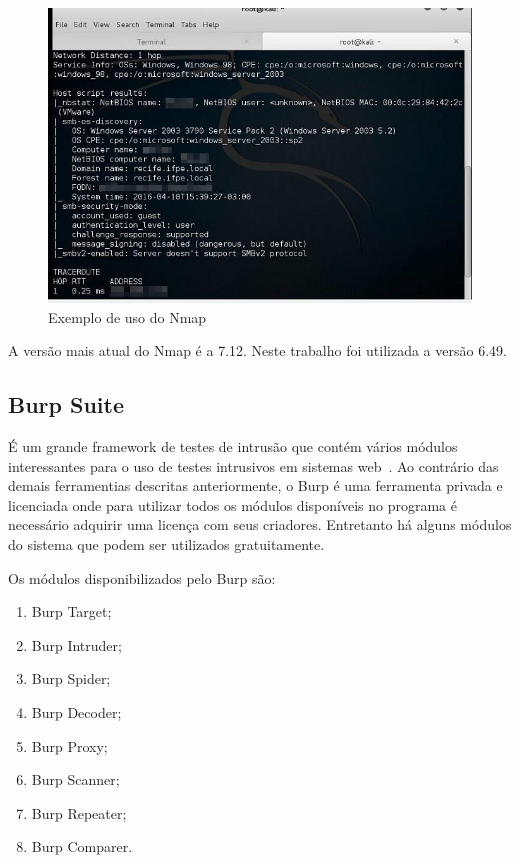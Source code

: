 \documentclass[
    12pt,               %
    openright,          %
    oneside,            %
    a4paper,            %
    section=TITLE,     %
    english,            %
    french,             %
    spanish,            %
    brazil              %
    ]{abntex2}
\newcommand{\citep}{\cite}
\begin{document}
\begin{figure}[htp]
\centering
\caption{Exemplo de uso do Nmap}
\includegraphics[width=450px]{image8.jpeg}
\end{figure}
\ifdefined\FloatBarrier \FloatBarrier \fi


A versão mais atual do Nmap é a 7.12. Neste trabalho foi utilizada a versão 6.49.



\subsection*{Burp Suite}

É um grande framework de testes de intrusão que contém vários módulos interessantes para o uso de testes intrusivos em sistemas web\citep{62224}~. Ao contrário das demais ferramentias descritas anteriormente, o Burp é uma ferramenta privada e licenciada onde para utilizar todos os módulos disponíveis no programa é necessário adquirir uma licença com seus criadores. Entretanto há alguns módulos do sistema que podem ser utilizados gratuitamente.


Os módulos disponibilizados pelo Burp são:



\begin{enumerate}[start=1]
	
\item Burp Target;
	
\item Burp Intruder;
	
\item Burp Spider;
	
\item Burp Decoder;
	
\item Burp Proxy;
	
\item Burp Scanner;
	
\item Burp Repeater;
	
\item Burp Comparer.

\end{enumerate}
\end{document}
